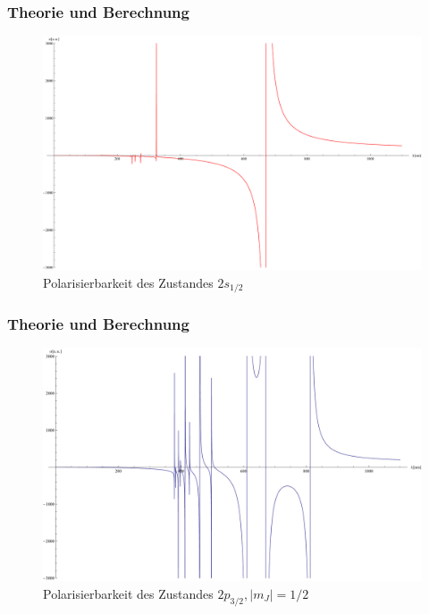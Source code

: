 \documentclass{beamer}
\begin{document}
\begin{frame}
	\frametitle{Theorie und Berechnung}
\begin{center}
	\begin{figure}
                \includegraphics[scale=0.24]{polarizegr}
           	\caption{Polarisierbarkeit des Zustandes $2s_{1/2}$}
\end{figure}
\end{center}
\end{frame}
\begin{frame}
	\frametitle{Theorie und Berechnung}
\begin{center}
	\begin{figure}
                \includegraphics[scale=0.24]{polarizeex1}
           	\caption{Polarisierbarkeit des Zustandes $2p_{3/2}, |m_J|=1/2$ }
\end{figure}
\end{center}
\end{frame}
\end{document}
